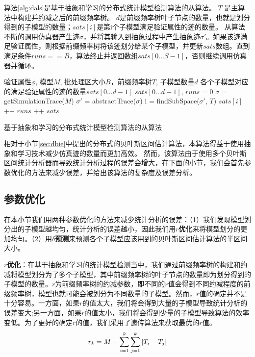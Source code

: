 算法\ref{alg:dals}是基于抽象和学习的分布式统计模型检测算法的从算法。 $T$ 是主算法中构建并约减之后的前缀频率树。 $d$是前缀频率树叶子节点的数量，也就是划分得到的子模型的数量；$sats[i]$是第i个子模型满足验证属性的迹的数量。 从算法不断的调用仿真器产生迹$\sigma$，并将其输入到抽象过程中产生抽象迹$\sigma'$。如果该迹满足验证属性，则根据前缀频率树将该迹划分给某个子模型，并更新$sats$数组。直到满足条件$runs == B$，算法终止并返回数组$sats[0...S-1]$，否则继续调用仿真器并循环。

\begin{algorithm}[t]
\begin{algorithmic}[1]
\REQUIRE 验证属性$\phi$, 模型$M$, 批处理区大小$B$，前缀频率树$T$, 子模型数量$d$
\ENSURE 各个子模型对应的满足验证属性的迹的数量$sats[0...d-1]$
\STATE $sats[0...d-1]$, $runs$ = 0
\LOOP
        \STATE $\sigma$ = getSimulationTrace($M$)
        \STATE $\sigma'$ = abstractTrace($\sigma$)
        \IF{$\sigma \models \phi$}
           \STATE i = findSubSpace($\sigma'$, $T$)
           \STATE $sats[i]$ ++
         \ENDIF
        \STATE $runs$ ++ 
\RETURN $sats$
\ENDIF
\ENDLOOP
\end{algorithmic}
\caption{基于抽象和学习的分布式统计模型检测算法的从算法}
\label{alg:dals}
\end{algorithm}
相对于小节\ref{sec:dbie}中提出的分布式的贝叶斯区间估计算法，本算法得益于使用抽象和学习技术减少仿真迹的数量而更加高效。 然而，该算法由于使用多个贝叶斯区间统计分析器而导致统计分析过程的误差会增大，在下面的小节，我们会首先参数优化的方法来减少误差，并给出该算法的复杂度及误差分析。

\subsection{参数优化}
\label{sec:opt}
在本小节我们用两种参数优化的方法来减少统计分析的误差：（1）我们发现模型划分出的子模型越均匀，统计分析的误差越小，因此我们用\textbf{$r$优化}来将模型划分的更加均匀。（2）用\textbf{$\delta$预测}来预测各个子模型应该用到的贝叶斯区间估计算法的半区间大小。

\textbf{$r$优化}：在基于抽象和学习的统计模型检测当中，我们通过前缀频率树的构建和约减将模型划分为了多个子模型，其中前缀频率树的叶子节点的数量即为划分得到的子模型的数量。$r$为前缀频率树的约减参数，即不同的$r$值会得到不同约减程度的前缀频率树，模型也就可能会被划分为不同数量的子模型。然而，$r$值的确定并不是十分容易。一方面，如果$r$的值太大，我们将会得到大量的子模型导致统计分析的误差变大;另一方面，如果$r$的值太小，我们将会得到少量的子模型导致算法的效率变低。为了更好的确定$r$的值，我们采用了遗传算法\cite{DBLP:books/daglib/0019871}来获取最优的$r$值。 
\begin{equation}
\centering
\label{formula1}
r_k = M - \sum\limits_{i=1}^k \sum\limits_{j=1}^k |T_i - T_j| 
\end{equation}

